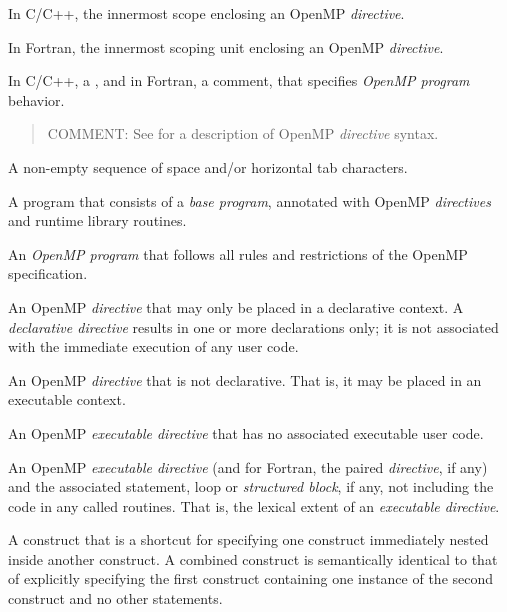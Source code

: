\glossarydefstart
In C/C++, the innermost scope enclosing an OpenMP \emph{directive}.

In Fortran, the innermost scoping unit enclosing an OpenMP \emph{directive}.
\glossarydefend

\glossarydefstart
In C/C++, a , and in Fortran, a comment, that specifies \emph{OpenMP
program} behavior.

\begin{quote}
COMMENT: See  for a description of OpenMP \emph{directive} syntax.
\end{quote}
\glossarydefend


\glossarydefstart
A non-empty sequence of space and/or horizontal tab characters.
\glossarydefend

\glossarydefstart
A program that consists of a \emph{base program}, annotated with OpenMP \emph{directives} and 
runtime library routines.
\glossarydefend

\glossarydefstart
An \emph{OpenMP program} that follows all rules and restrictions of the OpenMP 
specification.
\glossarydefend

\glossarydefstart
An OpenMP \emph{directive} that may only be placed in a declarative context. A 
\emph{declarative directive} results in one or more declarations only; it is not associated 
with the immediate execution of any user code.
\glossarydefend

\glossarydefstart
An OpenMP \emph{directive} that is not declarative. That is, it may be placed in an 
executable context.
\glossarydefend

\glossarydefstart
An OpenMP \emph{executable directive} that has no associated executable user code.
\glossarydefend


\glossarydefstart
An OpenMP \emph{executable directive} (and for Fortran, the paired  \emph{directive}, if 
any) and the associated statement, loop or \emph{structured block}, if any, not including 
the code in any called routines. That is, the lexical extent of an \emph{executable 
directive}.
\glossarydefend

\glossarydefstart
A construct that is a shortcut for specifying one construct immediately nested inside another construct. A combined construct is semantically identical to that of explicitly specifying the first construct containing one instance of the second construct and no other statements.
\glossarydefend

